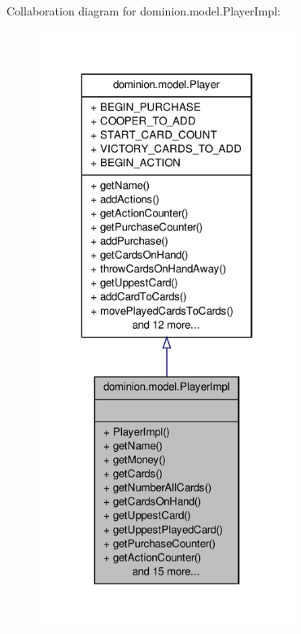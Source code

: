 \-Collaboration diagram for dominion.\-model.\-Player\-Impl\-:
\nopagebreak
\begin{figure}[H]
\begin{center}
\leavevmode
\includegraphics[height=550pt]{classdominion_1_1model_1_1PlayerImpl__coll__graph}
\end{center}
\end{figure}
